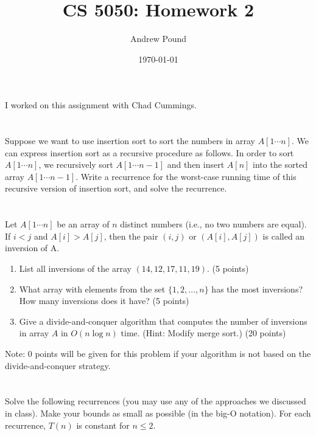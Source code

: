 \documentclass{article}
\title{CS 5050: Homework 2}
\author{Andrew Pound}
\date{\today}
\begin{document}
\maketitle

I worked on this assignment with Chad Cummings.
\section{}
 Suppose we want to use insertion sort to sort the numbers in array
 $A[ 1\cdots n ]$. We can express insertion sort as a recursive
 procedure as follows. In order to sort $ A[1\cdots n]$, we
 recursively sort $A[1\cdots n-1]$ and then insert $A[n]$ into the
 sorted array $A[1\cdots n-1]$. Write a  recurrence for the worst-case
 running time of this recursive version of insertion sort, and solve
 the recurrence. 





\section{}
 Let $A[1\cdots n]$ be an array of $n$ distinct numbers (i.e., no two
 numbers are equal). If $i < j$ and $A[i] > A[j]$, then the pair
 $(i,j)$ or $(A[i],A[j])$ is called an inversion of A. 
 \begin{enumerate}[label=(\alph*)]
 \item List all inversions of the array $(14,12,17,11,19)$. (5 points)
 \item What array with elements from the set $\{1,2,...,n\}$ has the
   most inversions? How many inversions does it have? (5 points) 
 \item Give a divide-and-conquer algorithm that computes the number of 
   inversions in array $A$ in $O(n\log n)$ time. (Hint: Modify merge
   sort.) (20 points) 
 \end{enumerate}
Note: 0 points will be given for this problem if your algorithm is not
based on the divide-and-conquer strategy.

\section{}
 Solve the following recurrences (you may use any of the approaches we
 discussed in class). Make your bounds as small as possible (in the
 big-O notation). For each recurrence, $T(n)$ is constant for $n \le
 2$.  
\end{document}
